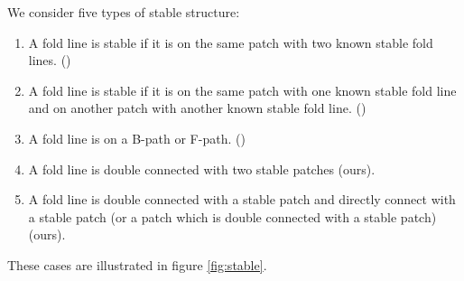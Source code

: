 

We consider five types of stable structure:
\begin{enumerate}
\item A fold line is stable if it is on the same patch with two known stable fold lines. (\cite{li2010popup})
\item A fold line is stable if it is on the same patch with one known stable fold line and on another patch with another known stable fold line. (\cite{li2010popup})
\item A fold line is on a B-path or F-path. (\cite{le2014surface})
\item A fold line is double connected with two stable patches (ours).
\item A fold line is double connected with a stable patch and directly connect with a stable patch (or a patch which is double connected with a stable patch) (ours).
\end{enumerate}

    These cases are illustrated in figure \ref{fig:stable}.


